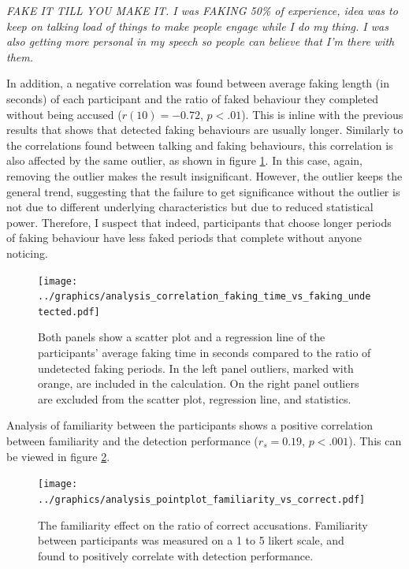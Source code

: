 \documentclass[]{simple-thesis}
\begin{document}
\begin{displayquote}
  \textit{
    FAKE IT TILL YOU MAKE IT.
    I was FAKING 50\% of experience, idea was to keep on talking load of things to make people engage while I do my thing.
    I was also getting more personal in my speech so people can believe that I'm there with them.
  }
\end{displayquote}

In addition, a negative correlation was found between average faking length (in seconds) of each participant and the ratio of faked behaviour they completed without being accused ($r(10) = -0.72$, $p < .01$).
This is inline with the previous results that shows that detected faking behaviours are usually longer.
Similarly to the correlations found between talking and faking behaviours, this correlation is also affected by the same outlier, as shown in figure \ref{fig:analysis:analysis_correlation_faking_time_vs_faking_undetected}.
In this case, again, removing the outlier makes the result insignificant.
However, the outlier keeps the general trend, suggesting that the failure to get significance without the outlier is not due to different underlying characteristics but due to reduced statistical power.
Therefore, I suspect that indeed, participants that choose longer periods of faking behaviour have less faked periods that complete without anyone noticing.

\begin{figure}
  \centering
  \texttt{[image: ../graphics/analysis\_correlation\_faking\_time\_vs\_faking\_undetected.pdf]}
  \caption{Both panels show a scatter plot and a regression line of the participants' average faking time in seconds compared to the ratio of undetected faking periods. In the left panel outliers, marked with orange, are included in the calculation. On the right panel outliers are excluded from the scatter plot, regression line, and statistics.}
  \label{fig:analysis:analysis_correlation_faking_time_vs_faking_undetected}
\end{figure}

Analysis of familiarity between the participants shows a positive correlation between familiarity and the detection performance ($r_s = 0.19$, $p < .001$).
This can be viewed in figure \ref{fig:analysis:analysis_pointplot_familiarity_vs_correct}.

\begin{figure}
  \centering
  \texttt{[image: ../graphics/analysis\_pointplot\_familiarity\_vs\_correct.pdf]}
  \caption{The familiarity effect on the ratio of correct accusations. Familiarity between participants was measured on a 1 to 5 likert scale, and found to positively correlate with detection performance.}
  \label{fig:analysis:analysis_pointplot_familiarity_vs_correct}
\end{figure}
\end{document}
